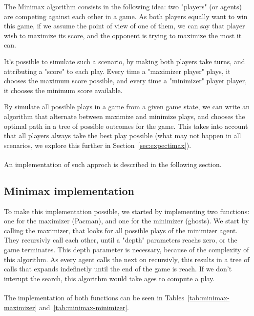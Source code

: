 \documentclass{article}
\begin{document}
The Minimax algorithm consists in the following idea: two "players" (or agents) are competing against each other in a game. As both players equally want to win this game, if we assume the point of view of one of them, we can say that player wish to maximize its score, and the opponent is trying to maximize the most it can.

It's possible to simulate such a scenario, by making both players take turns, and attributing a "score" to each play. Every time a "maximizer player" plays, it chooses the maximum score possible, and every time a "minimizer" player player, it chooses the minimum score available.

By simulate all possible plays in a game from a given game state, we can write an algorithm that alternate between maximize and minimize plays, and chooses the optimal path in a tree of possible outcomes for the game. This takes into account that all players always take the best play possible (what may not happen in all scenarios, we explore this further in Section~\ref{sec:expectimax}).
~\\
~\\
An implementation of such approch is described in the following section.

\subsection{Minimax implementation}

To make this implementation possible, we started by implementing two functions: one for the maximizer (Pacman), and one for the minimizer (ghosts). We start by calling the maximizer, that looks for all possible plays of the minimizer agent. They recursivly call each other, until a "depth" parameters reachs zero, or the game terminates. This depth parameter is necessary, because of the complexity of this algorithm. As every agent calls the next on recursivly, this results in a tree of calls that expands indefinetly until the end of the game is reach. If we don't interupt the search, this algorithm would take ages to compute a play.
~\\
~\\
The implementation of both functions can be seen in Tables~\ref{tab:minimax-maximizer} and~\ref{tab:minimax-minimizer}.
\end{document}
